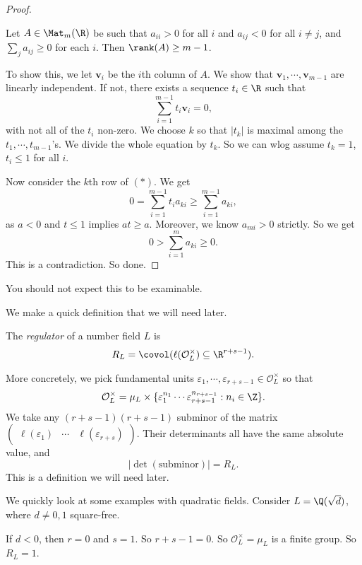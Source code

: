 \documentclass[a4paper]{article}
\begin{document}
\begin{proof}
  \begin{claim}
    Let $A \in \Mat_{m}(\R)$ be such that $a_{ii} > 0$ for all $i$ and $a_{ij} < 0$ for all $i\not= j$, and $\sum_j a_{ij} \geq 0$ for each $i$. Then $\rank(A) \geq m - 1$.
  \end{claim}

  To show this, we let $\mathbf{v}_i$ be the $i$th column of $A$. We show that $\mathbf{v}_1, \cdots, \mathbf{v}_{m - 1}$ are linearly independent. If not, there exists a sequence $t_i \in \R$ such that
  \[
    \sum_{i = 1}^{m - 1} t_i \mathbf{v}_i = 0,\tag{$*$}
  \]
  with not all of the $t_i$ non-zero. We choose $k$ so that $|t_k|$ is maximal among the $t_1, \cdots, t_{m - 1}$'s. We divide the whole equation by $t_k$. So we can wlog assume $t_k = 1$, $t_i \leq 1$ for all $i$.

  Now consider the $k$th row of $(*)$. We get
  \[
    0 = \sum_{i = 1}^{m - 1} t_i a_{ki} \geq \sum_{i = 1}^{m - 1} a_{ki},
  \]
  as $a < 0$ and $t \leq 1$ implies $at \geq a$. Moreover, we know $a_{mi} > 0$ strictly. So we get
  \[
    0 > \sum_{i = 1}^m a_{ki} \geq 0.
  \]
  This is a contradiction. So done.
\end{proof}
You should not expect this to be examinable.

We make a quick definition that we will need later.
\begin{defi}[Regulator]
  The \emph{regulator} of a number field $L$ is
  \[
    R_L = \covol (\ell(\mathcal{O}_L^\times) \subseteq \R^{r + s - 1}).
  \]
\end{defi}
More concretely, we pick fundamental units $\varepsilon_1, \cdots, \varepsilon_{r + s - 1} \in \mathcal{O}_L^\times$ so that
\[
  \mathcal{O}_L^\times = \mu_L \times \{\varepsilon_1^{n_1} \cdots \varepsilon_{r + s - 1}^{n_{r + s - 1}} : n_i \in \Z\}.
\]
We take any $(r + s - 1)(r + s - 1)$ subminor of the matrix $\begin{pmatrix} \ell(\varepsilon_1) & \cdots & \ell(\varepsilon_{r + s})\end{pmatrix}$. Their determinants all have the same absolute value, and
\[
  |\det(\text{subminor})| = R_L.
\]
This is a definition we will need later.

We quickly look at some examples with quadratic fields. Consider $L = \Q(\sqrt{d})$, where $d \not= 0, 1$ square-free.
\begin{eg}
  If $d < 0$, then $r = 0$ and $s = 1$. So $r + s - 1 = 0$. So $\mathcal{O}_L^\times = \mu_L$ is a finite group. So $R_L = 1$.
\end{eg}
\end{document}
